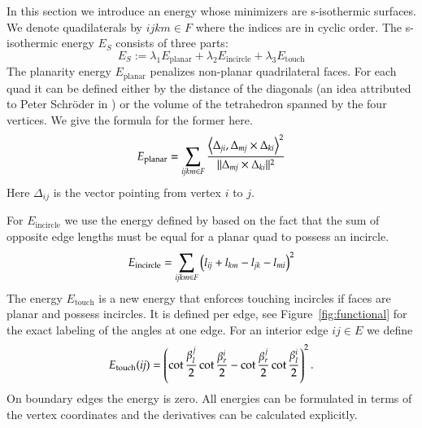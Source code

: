 \documentclass[Thesis.tex]{subfiles}
\begin{document}
In this section we introduce an energy whose minimizers are s-isothermic
surfaces. We denote quadilaterals by $ijkm\in F$ where the indices are in 
cyclic order.
The s-isothermic energy $E_S$ consists of three parts:
\begin{equation}
  E_S := 
  \lambda_1 E_{\mathrm{planar}} + 
  \lambda_2 E_{\mathrm{incircle}} + 
  \lambda_3 E_{\mathrm{touch}}
\end{equation}
The planarity energy $E_{\mathrm{planar}}$ penalizes non-planar quadrilateral
faces. For each quad it can be defined either by the distance of the diagonals
(an idea attributed to Peter Schr\"oder in \cite{PottmannSBSWBW2008}) or the
volume of the tetrahedron spanned by the
four vertices. We give the formula for the former here. 
\begin{equation}
E_{\mathrm{planar}} = \sum_{\mathrm{\it{ijkm}} \in F} \frac{\left<\Delta_{\mathrm{\it{ji}}},\Delta_{\mathrm{\it{mj}}} \times \Delta_{\mathrm{\it{ki}}}\right>^2}
{\Vert\Delta_{\mathrm{\it{mj}}} \times \Delta_{\mathrm{\it{ki}}}\Vert^2}
\end{equation}
Here $\Delta_{ij}$ is the vector pointing from vertex $i$ to $j$.

For $E_{\mathrm{incircle}}$ we use the energy defined by
\cite{SchiftnerHWP2009} based on the fact that the sum of opposite edge
lengths must be equal for a planar quad to possess an incircle.
\begin{equation}
E_{\mathrm{incircle}} = \sum_{\mathrm{\it{ijkm}} \in F} \left( l_{\mathrm{\it{ij}}} + 
l_{\mathrm{\it{km}}} - l_{\mathrm{\it{jk}}} - l_{\mathrm{\it{mi}}} \right)^2
\end{equation}
The energy
$E_{\mathrm{touch}}$ is a new energy that enforces touching incircles
if faces are planar and possess incircles.  It is defined per edge, see
Figure~\ref{fig:functional} for the exact labeling of the angles at one edge.
For an interior edge $ij\in E$ we define
\begin{equation}
  E_{\mathrm{touch}}(\mathrm{\it{ij}})=
  \left(\cot\frac{\beta^j_l}{2}\cot\frac{\beta^i_r}{2} - 
\cot\frac{\beta^j_r}{2}\cot\frac{\beta^i_l}{2}\right)^2.
\end{equation}
On boundary edges the energy is zero. All energies can be formulated 
in terms of the vertex coordinates and the derivatives can be calculated explicitly.
\end{document}

